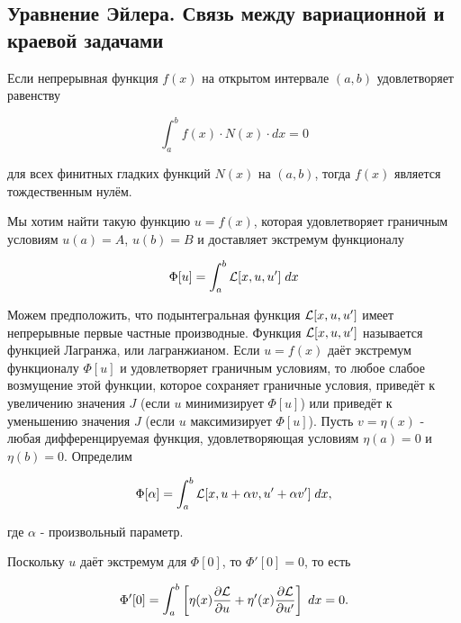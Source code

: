 \documentclass{article}
\begin{document}

\subsection{Уравнение Эйлера. Связь между вариационной и краевой задачами}

\begin{warn}
	Если непрерывная функция $f(x)$ на открытом интервале $(a, b)$ удовлетворяет равенству
	
\begin{displaymath}
	\int_{a}^{b} f(x) \cdot N(x) \cdot dx = 0
\end{displaymath}

\noindent для всех финитных гладких функций $N(x)$ на $(a, b)$, тогда $f(x)$ является тождественным нулём.
\end{warn}

Мы хотим найти такую функцию $u = f(x)$, которая удовлетворяет граничным условиям $u(a) = A$, $u(b) = B$ и доставляет экстремум функционалу

\begin{displaymath}
	\Phi[u] = \int_{a}^{b} \mathcal{L}[x, u, u'] \; dx
\end{displaymath}

Можем предположить, что подынтегральная функция $\mathcal{L}[x, u, u']$ имеет непрерывные первые частные производные. Функция $\mathcal{L}[x, u, u']$ называется функцией Лагранжа, или лагранжианом. Если $u = f(x)$ даёт экстремум функционалу $\Phi[u]$ и удовлетворяет граничным условиям, то любое слабое возмущение этой функции, которое сохраняет граничные условия, приведёт к увеличению значения $J$ (если $u$ минимизирует $\Phi[u]$) или приведёт к уменьшению значения $J$ (если $u$ максимизирует $\Phi[u]$).
Пусть $v = \eta(x)$ - любая дифференцируемая функция, удовлетворяющая условиям $\eta(a) = 0$ и $\eta(b) = 0$.
Определим

\begin{displaymath}
	\Phi[\alpha] = \int_{a}^{b} \mathcal{L}[x, u + \alpha v, u' +  \alpha v'] \; dx,
\end{displaymath}

\noindent где $\alpha$ - произвольный параметр.

Поскольку $u$ даёт экстремум для $\Phi[0]$, то $\Phi'[0] = 0$, то есть

\begin{displaymath}
	\Phi'[0] = \int_{a}^{b} \left[ \eta(x) \frac{\partial \mathcal{L}}{\partial u} + \eta ' (x) \frac{\partial \mathcal{L}}{\partial u'} \right]  \; dx = 0.
\end{displaymath}
\end{document}

